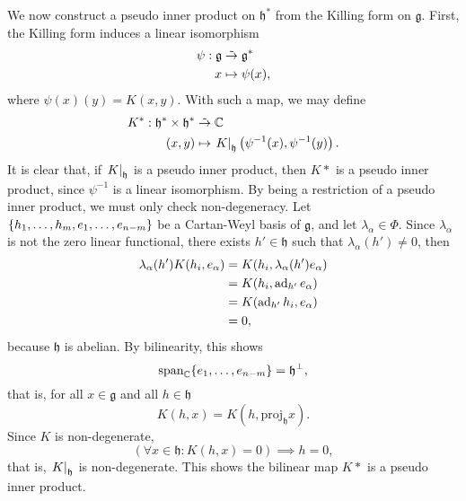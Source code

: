 We now construct a pseudo inner product on \(\mathfrak{h}^{\ast}\) from the Killing form on \(\mathfrak{g}\). First, the Killing form induces a linear isomorphism
\begin{align*}
    \psi : \mathfrak{g} &\mathrel{\tilde{\to}} \mathfrak{g}^{\ast}\\
                      x &\mapsto \psi(x),
\end{align*}
where \(\psi(x)(y) = K(x,y).\) With such a map, we may define
\begin{align*}
    K^{\ast} : \mathfrak{h}^{\ast} \times \mathfrak{h}^{\ast} &\mathrel{\tilde{\to}} \mathbb{C}\\
    (x,y) &\mapsto \left.K\right\rvert_{\mathfrak{h}}\left(\psi^{-1}(x), \psi^{-1}(y)\right).
\end{align*}
It is clear that, if \(\left.K\right\rvert_{\mathfrak{h}}\) is a pseudo inner product, then \(K*\) is a pseudo inner product, since \(\psi^{-1}\) is a linear isomorphism. By being a restriction of a pseudo inner product, we must only check non-degeneracy. Let \(\{h_1, \dots, h_m, e_1, \dots, e_{n-m}\}\) be a Cartan-Weyl basis of \(\mathfrak{g}\), and let \(\lambda_{\alpha} \in \Phi.\) Since \(\lambda_{\alpha}\) is not the zero linear functional, there exists \(h' \in \mathfrak{h}\) such that \(\lambda_{\alpha}(h') \neq 0\), then
\begin{align*}
    \lambda_{\alpha}(h') K(h_i, e_{\alpha}) &= K(h_i, \lambda_{\alpha}(h')e_{\alpha})\\
                                             &= K(h_i, \operatorname{ad}_{h'}e_{\alpha})\\
                                             &= K(\operatorname{ad}_{h'}h_i, e_{\alpha})\\
                                             &= 0,
\end{align*}
because \(\mathfrak{h}\) is abelian. By bilinearity, this shows
\begin{equation*}
    \mathrm{span}_{\mathbb{C}}\{e_1, \dots, e_{n-m}\} = \mathfrak{h}^{\perp},
\end{equation*}
that is, for all \(x \in \mathfrak{g}\) and all \(h \in \mathfrak{h}\)
\begin{equation*}
    K(h, x) = K(h, \mathrm{proj}_{\mathfrak{h}}x).
\end{equation*}
Since \(K\) is non-degenerate,
\begin{equation*}
    (\forall x \in \mathfrak{h} : K(h, x) = 0) \implies h = 0,
\end{equation*}
that is, \(\left.K\right\rvert_{\mathfrak{h}}\) is non-degenerate. This shows the bilinear map \(K*\) is a pseudo inner product.

